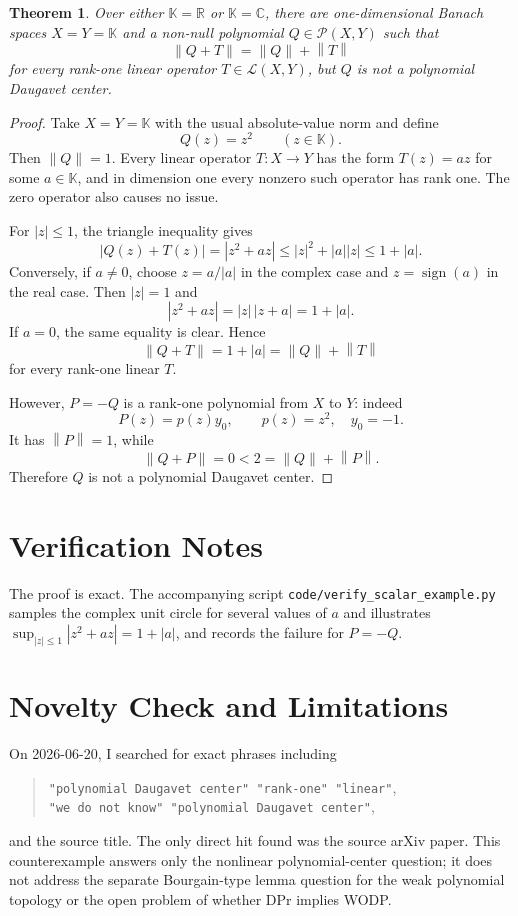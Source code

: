 \documentclass[11pt]{article}
\newtheorem{theorem}{Theorem}
\newcommand{\K}{\mathbb K}
\newcommand{\C}{\mathbb C}
\newcommand{\R}{\mathbb R}
\newcommand{\Pol}{\mathcal P}
\newcommand{\Lin}{\mathcal L}
\newcommand{\norm}[1]{\left\lVert #1 \right\rVert}
\begin{document}
\begin{theorem}
Over either \(\K=\R\) or \(\K=\C\), there are one-dimensional Banach spaces
\(X=Y=\K\) and a non-null polynomial \(Q\in\Pol(X,Y)\) such that
\[
\norm{Q+T}=\norm{Q}+\norm{T}
\]
for every rank-one linear operator \(T\in\Lin(X,Y)\), but \(Q\) is not a
polynomial Daugavet center.
\end{theorem}

\begin{proof}
Take \(X=Y=\K\) with the usual absolute-value norm and define
\[
Q(z)=z^2 \qquad (z\in\K).
\]
Then \(\norm{Q}=1\).  Every linear operator \(T:X\to Y\) has the form
\(T(z)=az\) for some \(a\in\K\), and in dimension one every nonzero such
operator has rank one.  The zero operator also causes no issue.

For \(|z|\leq 1\), the triangle inequality gives
\[
|Q(z)+T(z)|=|z^2+az|\leq |z|^2+|a||z|\leq 1+|a|.
\]
Conversely, if \(a\neq 0\), choose \(z=a/|a|\) in the complex case and
\(z=\operatorname{sign}(a)\) in the real case.  Then \(|z|=1\) and
\[
|z^2+az|=|z|\,|z+a|=1+|a|.
\]
If \(a=0\), the same equality is clear.  Hence
\[
\norm{Q+T}=1+|a|=\norm{Q}+\norm{T}
\]
for every rank-one linear \(T\).

However, \(P=-Q\) is a rank-one polynomial from \(X\) to \(Y\): indeed
\[
P(z)=p(z)y_0,\qquad p(z)=z^2,\quad y_0=-1.
\]
It has \(\norm{P}=1\), while
\[
\norm{Q+P}=0 < 2=\norm{Q}+\norm{P}.
\]
Therefore \(Q\) is not a polynomial Daugavet center.
\end{proof}

\section*{Verification Notes}

The proof is exact.  The accompanying script
\texttt{code/verify\_scalar\_example.py} samples the complex unit circle for
several values of \(a\) and illustrates
\(\sup_{|z|\leq1}|z^2+az|=1+|a|\), and records the failure for \(P=-Q\).

\section*{Novelty Check and Limitations}

On 2026-06-20, I searched for exact phrases including
\begin{quote}\small
\texttt{"polynomial Daugavet center" "rank-one" "linear"},\\
\texttt{"we do not know" "polynomial Daugavet center"},
\end{quote}
and the source title.  The only direct hit found was the source arXiv paper.
This counterexample answers only the nonlinear polynomial-center question; it
does not address the separate Bourgain-type lemma question for the weak
polynomial topology or the open problem of whether DPr implies WODP.
\end{document}
